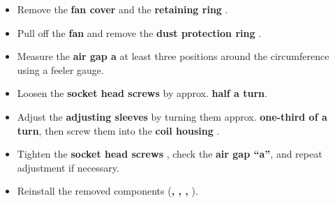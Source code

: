 \begin{itemize}
    \setlength{\itemsep}{0pt} \setlength{\parskip}{0pt}
    \item Remove the \textbf{fan cover } and the \textbf{retaining ring }.
    \item Pull off the \textbf{fan } and remove the \textbf{dust protection ring }.
    \item Measure the \textbf{air gap a} at least three positions around the circumference using a feeler gauge.
    \item Loosen the \textbf{socket head screws } by approx. \textbf{half a turn}.
    \item Adjust the \textbf{adjusting sleeves } by turning them approx. \textbf{one-third of a turn},  
          then screw them into the \textbf{coil housing }.
    \item Tighten the \textbf{socket head screws }, check the \textbf{air gap \enquote{a}}, and repeat \\adjustment if necessary.
    \item Reinstall the removed components (\textbf{, , , }).
\end{itemize}


